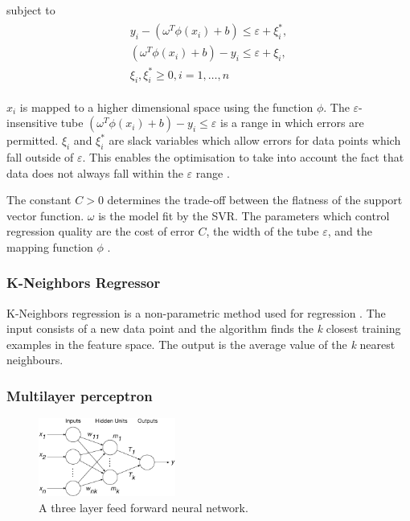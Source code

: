 \documentclass[final,3p,times,twocolumn,numbers]{elsarticle}
\begin{document}
\noindent subject to
\begin{align}
\begin{multlined}
\label{svr:constrains}
y_i-(\omega^T\phi(x_i)+b)\leq\varepsilon+\xi_i^{*},\\
(\omega^T\phi(x_i)+b)-y_i\leq\varepsilon+\xi_i,\\
\xi_i,\xi^*_i\geq0,i=1,\ldots,n
\end{multlined}
\end{align}

\noindent $x_i$ is mapped to a higher dimensional space using the function $\phi$. The $\varepsilon$-insensitive tube $(\omega^T\phi(x_i)+b)-y_i\leq\varepsilon$ is a range in which errors are permitted. $\xi_i$ and $\xi^*_i$ are slack variables which allow errors for data points which fall outside of $\varepsilon$. This enables the optimisation to take into account the fact that data does not always fall within the $\varepsilon$ range \cite{Smola2004}.

The constant $C>0$ determines the trade-off between the flatness of the support vector function. $\omega$ is the model fit by the SVR. The parameters which control regression quality are the cost of error $C$, the width of the tube $\varepsilon$, and the mapping function $\phi$ \cite{Shu2006,Chen2004}. 


\subsubsection{K-Neighbors Regressor}

K-Neighbors regression is a non-parametric method used for regression \cite{forgy65}. The input consists of a new data point and the algorithm finds the \textit{k} closest training examples in the feature space. The output is the average value of the \textit{k} nearest neighbours.



\subsubsection{Multilayer perceptron}


\begin{figure}
\centering
    \includegraphics[width=0.4\textwidth]{figures/methods/Kell_eEnergy_Fig1.eps}
    \caption{A three layer feed forward neural network.}
    \label{fig:mlp}
\end{figure}
\end{document}
